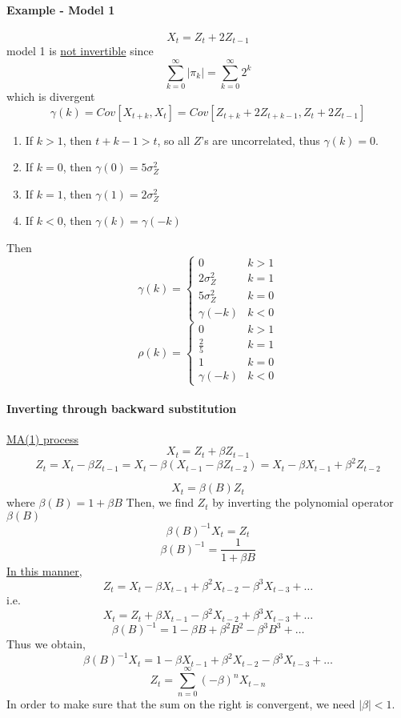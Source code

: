 \documentclass[11pt]{article}
\newcommand{\under}[1]{\underline{#1}}
\begin{document}
\paragraph{Example - Model 1}
$$X_t = Z_t + 2 Z_{t-1}$$
model 1 is \under{not invertible} since
$$\sum_{k=0}^\infty |\pi_k| = \sum_{k=0}^\infty 2^k$$
which is divergent
$$\gamma(k) = Cov[X_{t+k}, X_t] = Cov[Z_{t+k} + 2Z_{t+k-1}, Z_t + 2Z_{t-1}]$$
\begin{enumerate}
	\item If $k > 1$, then $t +k - 1 > t$, so all $Z$'s are uncorrelated, thus $\gamma(k) = 0$.
	\item If $k = 0$, then $\gamma(0) = 5 \sigma_Z^2$
	\item If $k = 1$, then $\gamma(1) = 2 \sigma_Z^2$
	\item If $k < 0$, then $\gamma(k) = \gamma(-k)$
\end{enumerate}
Then
$$\gamma(k) = \begin{cases}
	0 & k > 1\\
	2\sigma_Z^2 & k=1 \\
	5\sigma_Z^2 & k=0 \\	
	\gamma(-k) & k < 0 
\end{cases}
$$
$$\rho(k) =  \begin{cases}
	0 & k > 1\\
	\frac{2}{5} & k=1 \\
	1 & k=0 \\	
	\gamma(-k) & k < 0 
\end{cases}
$$
\paragraph{Inverting through backward substitution}
\under{MA(1) process}
$$X_t = Z_t + \beta Z_{t-1}$$
$$ Z_t = X_t - \beta Z_{t-1} = X_t - \beta(X_{t-1} - \beta Z_{t-2}) = X_t - \beta X_{t-1} + \beta^2 Z_{t-2}$$

$$X_t = \beta(B) Z_t$$
where $\beta(B) = 1 + \beta B$
Then, we find $Z_t$ by inverting the polynomial operator $\beta(B)$
$$\beta(B)^{-1}X_t = Z_t$$
$$\beta(B)^{-1} = \frac{1}{1 + \beta B}$$
\under{In this manner,}
$$Z_t = X_t - \beta X_{t-1} + \beta^2 X_{t-2} - \beta^3X_{t-3} + \hdots$$
i.e.
$$X_t = Z_t + \beta X_{t-1} - \beta^2 X_{t-2} + \beta^3X_{t-3} + \hdots$$
$$\beta(B)^{-1} = 1 - \beta B + \beta^2B^2 - \beta^3B^3 + \hdots$$
Thus we obtain, 
$$\beta(B)^{-1}X_t = 1 - \beta X_{t-1} + \beta^2X_{t-2} - \beta^3 X_{t-3} + \hdots$$
$$Z_t = \sum_{n=0}^\infty (-\beta)^n X_{t-n}$$
In order to make sure that the sum on the right is convergent, we need $|\beta| < 1$.
\end{document}
